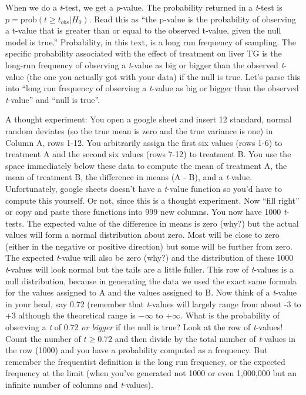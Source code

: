 \documentclass[]{book}
\begin{document}
When we do a \emph{t}-test, we get a \emph{p}-value. The probability returned in a \emph{t}-test is \(p = \mathrm{prob}(t \ge t_{obs} | H_0)\). Read this as ``the p-value is the probability of observing a t-value that is greater than or equal to the observed t-value, given the null model is true.'' Probability, in this text, is a long run frequency of sampling. The specific probability associated with the effect of treatment on liver TG is the long-run frequency of observing a \emph{t}-value as big or bigger than the observed \emph{t}-value (the one you actually got with your data) if the null is true. Let's parse this into ``long run frequency of observing a \emph{t}-value as big or bigger than the observed \emph{t}-value'' and ``null is true''.

A thought experiment: You open a google sheet and insert 12 standard, normal random deviates (so the true mean is zero and the true variance is one) in Column A, rows 1-12. You arbitrarily assign the first six values (rows 1-6) to treatment A and the second six values (rows 7-12) to treatment B. You use the space immediately below these data to compute the mean of treatment A, the mean of treatment B, the difference in means (A - B), and a \emph{t}-value. Unfortunately, google sheets doesn't have a \emph{t}-value function so you'd have to compute this yourself. Or not, since this is a thought experiment. Now ``fill right'' or copy and paste these functions into 999 new columns. You now have 1000 \emph{t}-tests. The expected value of the difference in means is zero (why?) but the actual values will form a normal distribution about zero. Most will be close to zero (either in the negative or positive direction) but some will be further from zero. The expected \emph{t}-value will also be zero (why?) and the distribution of these 1000 \emph{t}-values will look normal but the tails are a little fuller. This row of \emph{t}-values is a null distribution, because in generating the data we used the exact same formula for the values assigned to A and the values assigned to B. Now think of a \emph{t}-value in your head, say 0.72 (remember that \emph{t}-values will largely range from about -3 to +3 although the theoretical range is \(-\infty\) to \(+\infty\). What is the probability of observing a \emph{t} of 0.72 \emph{or bigger} if the null is true? Look at the row of \emph{t}-values! Count the number of \(t \ge 0.72\) and then divide by the total number of \emph{t}-values in the row (1000) and you have a probability computed as a frequency. But remember the frequentist definition is the long run frequency, or the expected frequency at the limit (when you've generated not 1000 or even 1,000,000 but an infinite number of columns and \emph{t}-values).
\end{document}
